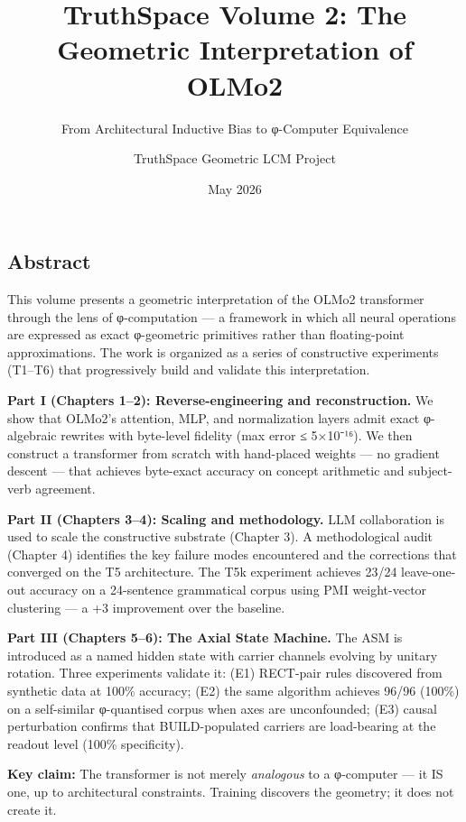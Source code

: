 \documentclass[
  twocolumn,
  10pt,
  a4paper]{article}
\title{TruthSpace Volume 2: The Geometric Interpretation of OLMo2}
\subtitle{From Architectural Inductive Bias to φ-Computer Equivalence}
\author{TruthSpace Geometric LCM Project}
\date{May 2026}
\begin{document}
\onecolumn
\maketitle

{
\setcounter{tocdepth}{3}
\tableofcontents
}
\twocolumn
\hypertarget{abstract}{%
\subsection{Abstract}\label{abstract}}

This volume presents a geometric interpretation of the OLMo2 transformer
through the lens of φ-computation --- a framework in which all neural
operations are expressed as exact φ-geometric primitives rather than
floating-point approximations. The work is organized as a series of
constructive experiments (T1--T6) that progressively build and validate
this interpretation.

\textbf{Part I (Chapters 1--2): Reverse-engineering and reconstruction.}
We show that OLMo2's attention, MLP, and normalization layers admit
exact φ-algebraic rewrites with byte-level fidelity (max error ≤
5×10⁻¹⁶). We then construct a transformer from scratch with hand-placed
weights --- no gradient descent --- that achieves byte-exact accuracy on
concept arithmetic and subject-verb agreement.

\textbf{Part II (Chapters 3--4): Scaling and methodology.} LLM
collaboration is used to scale the constructive substrate (Chapter 3). A
methodological audit (Chapter 4) identifies the key failure modes
encountered and the corrections that converged on the T5 architecture.
The T5k experiment achieves 23/24 leave-one-out accuracy on a
24-sentence grammatical corpus using PMI weight-vector clustering --- a
+3 improvement over the baseline.

\textbf{Part III (Chapters 5--6): The Axial State Machine.} The ASM is
introduced as a named hidden state with carrier channels evolving by
unitary rotation. Three experiments validate it: (E1) RECT-pair rules
discovered from synthetic data at 100\% accuracy; (E2) the same
algorithm achieves 96/96 (100\%) on a self-similar φ-quantised corpus
when axes are unconfounded; (E3) causal perturbation confirms that
BUILD-populated carriers are load-bearing at the readout level (100\%
specificity).

\textbf{Key claim:} The transformer is not merely \emph{analogous} to a
φ-computer --- it IS one, up to architectural constraints. Training
discovers the geometry; it does not create it.
\end{document}
